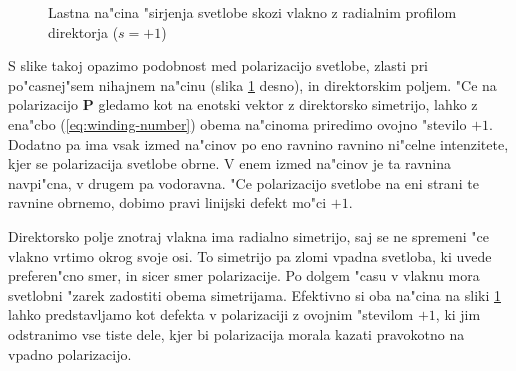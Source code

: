 \documentclass[12pt,twoside,openright,final]{report}
\renewcommand{\vec}{\mathbf}
\begin{document}
\begin{figure}[!htb]
 \centering
 \caption{Lastna na"cina "sirjenja svetlobe skozi vlakno z radialnim profilom direktorja ($s=+1$)}
 \label{fig:pulse-p1-mode}
\end{figure}

S slike takoj opazimo podobnost med polarizacijo svetlobe, zlasti pri po"casnej"sem nihajnem na"cinu (slika \ref{fig:pulse-p1-mode} desno), in direktorskim poljem. 
"Ce na polarizacijo $\vec P$ gledamo kot na enotski vektor z direktorsko simetrijo, lahko z ena"cbo (\ref{eq:winding-number}) obema na"cinoma priredimo ovojno "stevilo $+1$. 
Dodatno pa ima vsak izmed na"cinov po eno ravnino ravnino ni"celne intenzitete, kjer se polarizacija svetlobe obrne. 
V enem izmed na"cinov je ta ravnina navpi"cna, v drugem pa vodoravna. 
"Ce polarizacijo svetlobe na eni strani te ravnine obrnemo, dobimo pravi linijski defekt mo"ci $+1$. 

Direktorsko polje znotraj vlakna ima radialno simetrijo, saj se ne spremeni "ce vlakno vrtimo okrog svoje osi. 
To simetrijo pa zlomi vpadna svetloba, ki uvede preferen"cno smer, in sicer smer polarizacije. 
Po dolgem "casu v vlaknu mora svetlobni "zarek zadostiti obema simetrijama. 
Efektivno si oba na"cina na sliki \ref{fig:pulse-p1-mode} lahko predstavljamo kot defekta v polarizaciji z ovojnim "stevilom $+1$, ki jim odstranimo vse tiste dele, kjer bi polarizacija morala kazati pravokotno na vpadno polarizacijo. 
\end{document}

